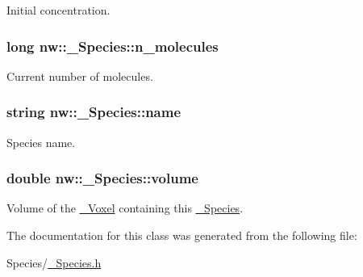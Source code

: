 Initial concentration. 

\hypertarget{classnw_1_1___species_af6ae0232b4f994b464a2f69cb022b33f}{
\subsubsection[{n\+\_\+molecules}]{\setlength{\rightskip}{0pt plus 5cm}long nw\+::\+\_\+\+Species\+::n\+\_\+molecules\hspace{0.3cm}{\ttfamily [protected]}}}\label{classnw_1_1___species_af6ae0232b4f994b464a2f69cb022b33f}


Current number of molecules. 

\hypertarget{classnw_1_1___species_a7b8ede09e28941beb48cf27f1247e2f9}{
\subsubsection[{name}]{\setlength{\rightskip}{0pt plus 5cm}string nw\+::\+\_\+\+Species\+::name\hspace{0.3cm}{\ttfamily [protected]}}}\label{classnw_1_1___species_a7b8ede09e28941beb48cf27f1247e2f9}


Species name. 

\hypertarget{classnw_1_1___species_a80896a55f086f468396e76ae8f1e8285}{
\subsubsection[{volume}]{\setlength{\rightskip}{0pt plus 5cm}double nw\+::\+\_\+\+Species\+::volume\hspace{0.3cm}{\ttfamily [protected]}}}\label{classnw_1_1___species_a80896a55f086f468396e76ae8f1e8285}


Volume of the \hyperlink{classnw_1_1___voxel}{\+\_\+\+Voxel} containing this \hyperlink{classnw_1_1___species}{\+\_\+\+Species}. 



The documentation for this class was generated from the following file\+:\begin{DoxyCompactItemize}
\item 
Species/\hyperlink{___species_8h}{\+\_\+\+Species.\+h}\end{DoxyCompactItemize}
